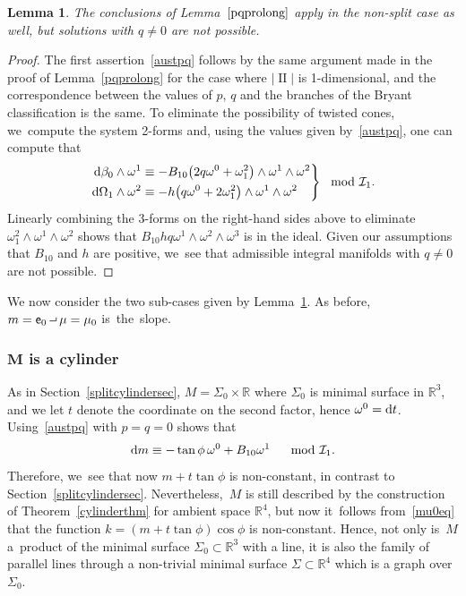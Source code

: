 \documentclass[pdftex]{sigma}
\def\R{\mathbb{R}}
\def\ve{\mathsf{e}}
\def\II{\operatorname{II}} %
\def\calI{\mathcal{I}}
\def\w{\omega}
\newcommand{\intprod}{\mathbin{\raisebox{.4ex}{\hbox{\vrule height .5pt width 5pt depth 0pt \vrule height 3pt width .5pt depth 0pt}}}}
\newtheorem{Lemma}[Theorem]{Lemma}
\numberwithin{equation}{section}
\begin{document}
\begin{Lemma} \label{non-split-cases}
The conclusions of Lemma~$\ref{pqprolong}$ apply in the non-split case as well, but solutions with $q\ne 0$ are not possible.
\end{Lemma}
\begin{proof}
The first assertion~\eqref{austpq} follows by the same argument made in the proof of Lemma~\ref{pqprolong} for the case where $|\II|$ is 1-dimensional,
and the correspondence between the values of $p$, $q$ and the branches of the Bryant classification is the same. To eliminate the possibility of twisted cones, we~compute the system 2-forms and, using the values given by~\eqref{austpq}, one can compute that
\begin{gather*}
\left.
\begin{aligned}
{\rm d}\beta_0 \wedge \w^1 &\equiv -B_{10} \big(2q\w^0 +\w^2_1\big) \wedge \w^1 \wedge \w^2 \\
{\rm d}\Omega_1 \wedge \w^2 &\equiv -h\big(q\w^0+2\w^2_1\big) \wedge \w^1 \wedge \w^2
\end{aligned}\right\} \mod \calI_1.
\end{gather*}
Linearly combining the 3-forms on the right-hand sides above to eliminate $\w^2_1 \wedge \w^1 \wedge \w^2$ shows that $B_{10} h q \w^1 \wedge \w^2 \wedge \w^3$ is in the ideal. Given our assumptions that $B_{10}$ and $h$ are positive, we~see that admissible integral manifolds with $q\ne 0$ are not possible.
\end{proof}

We now consider the two sub-cases given by Lemma~\ref{non-split-cases}. As before, $m = \ve_0 \intprod \mu = \mu_0$ is~the~slope.

\subsubsection[M is a cylinder]{$\boldsymbol M$ is a cylinder}

As in Section~\ref{splitcylindersec}, $M = \Sigma_0 \times\R$ where $\Sigma_0$ is minimal surface in $\R^3$, and we let $t$ denote the coordinate on the second factor, hence $\w^0 = {\rm d}t$. Using~\eqref{austpq} with $p=q=0$ shows that
\begin{gather} \label{nonsplitcylinderdm}
{\rm d}m \equiv -\tan \phi\, \w^0 + B_{10}\w^1 \quad \mod \calI_1.
\end{gather}
Therefore, we~see that now $m + t\tan \phi$ is non-constant, in contrast to Section~\ref{splitcylindersec}. Nevertheless,~$M$ is still described by the construction of Theorem~\ref{cylinderthm} for ambient space $\R^4$, but now it~follows from~\eqref{mu0eq} that the function $k=( m + t \tan \phi) \cos \phi$ is non-constant. Hence, not only is~$M$ a~product of the minimal surface $\Sigma_0 \subset \R^3$ with a line, it is also the family of parallel lines through a non-trivial minimal surface $\Sigma \subset \R^4$ which is a graph over $\Sigma_0$.
\end{document}
